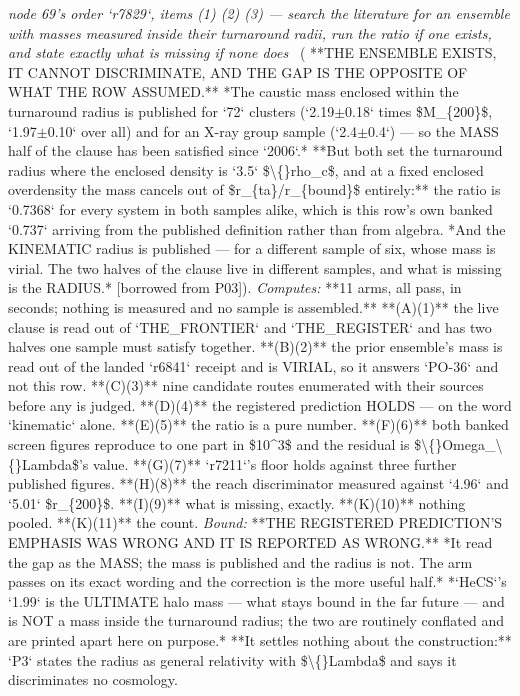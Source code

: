 \begin{description}
\textit{node 69's order `r7829`, items (1) (2) (3) --- search the literature for an ensemble with masses measured inside their turnaround radii, run the ratio if one exists, and state exactly what is missing if none does} \ ( **THE ENSEMBLE EXISTS, IT CANNOT DISCRIMINATE, AND THE GAP IS THE OPPOSITE OF WHAT THE ROW ASSUMED.** *The caustic mass enclosed within the turnaround radius is published for `72` clusters (`2.19\ensuremath{\pm}0.18` times \$M\_\{200\}\$, `1.97\ensuremath{\pm}0.10` over all) and for an X-ray group sample (`2.4\ensuremath{\pm}0.4`) --- so the MASS half of the clause has been satisfied since `2006`.* **But both set the turnaround radius where the enclosed density is `3.5` \$\textbackslash\{\}rho\_c\$, and at a fixed enclosed overdensity the mass cancels out of \$r\_\{ta\}/r\_\{bound\}\$ entirely:** the ratio is `0.7368` for every system in both samples alike, which is this row's own banked `0.737` arriving from the published definition rather than from algebra.  *And the KINEMATIC radius is published --- for a different sample of six, whose mass is virial. The two halves of the clause live in different samples, and what is missing is the RADIUS.* [borrowed from P03]). 
\emph{Computes:} **11 arms, all pass, in seconds; nothing is measured and no sample is assembled.** **(A)(1)** the live clause is read out of `THE\_FRONTIER` and `THE\_REGISTER` and has two halves one sample must satisfy together. **(B)(2)** the prior ensemble's mass is read out of the landed `r6841` receipt and is VIRIAL, so it answers `PO-36` and not this row. **(C)(3)** nine candidate routes enumerated with their sources before any is judged. **(D)(4)** the registered prediction HOLDS --- on the word `kinematic` alone. **(E)(5)** the ratio is a pure number. **(F)(6)** both banked screen figures reproduce to one part in \$10\textasciicircum{}3\$ and the residual is \$\textbackslash\{\}Omega\_\textbackslash\{\}Lambda\$'s value. **(G)(7)** `r7211`'s floor holds against three further published figures. **(H)(8)** the reach discriminator measured against `4.96` and `5.01` \$r\_\{200\}\$. **(I)(9)** what is missing, exactly. **(K)(10)** nothing pooled. **(K)(11)** the count.
 \emph{Bound:}  **THE REGISTERED PREDICTION'S EMPHASIS WAS WRONG AND IT IS REPORTED AS WRONG.** *It read the gap as the MASS; the mass is published and the radius is not. The arm passes on its exact wording and the correction is the more useful half.*  *`HeCS`'s `1.99` is the ULTIMATE halo mass --- what stays bound in the far future --- and is NOT a mass inside the turnaround radius; the two are routinely conflated and are printed apart here on purpose.*  **It settles nothing about the construction:** `P3` states the radius as general relativity with \$\textbackslash\{\}Lambda\$ and says it discriminates no cosmology.

\end{description}
